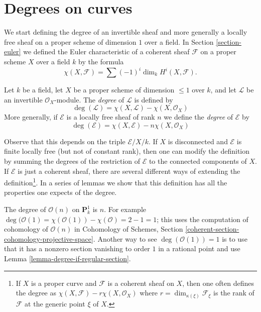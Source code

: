 \section{Degrees on curves}
\label{section-divisors-curves}

\noindent
We start defining the degree of an invertible sheaf and more generally
a locally free sheaf on a proper scheme
of dimension $1$ over a field. In Section \ref{section-euler}
we defined the Euler characteristic
of a coherent sheaf $\mathcal{F}$ on a proper scheme $X$ over a field
$k$ by the formula
$$
\chi(X, \mathcal{F}) = \sum (-1)^i \dim_k H^i(X, \mathcal{F}).
$$

\begin{definition}
\label{definition-degree-invertible-sheaf}
Let $k$ be a field, let $X$ be a proper scheme of dimension $\leq 1$
over $k$, and let $\mathcal{L}$ be an invertible $\mathcal{O}_X$-module.
The {\it degree} of $\mathcal{L}$ is defined by
$$
\deg(\mathcal{L}) = \chi(X, \mathcal{L}) - \chi(X, \mathcal{O}_X)
$$
More generally, if $\mathcal{E}$ is a locally free sheaf of rank $n$
we define the {\it degree} of $\mathcal{E}$ by
$$
\deg(\mathcal{E}) = \chi(X, \mathcal{E}) - n\chi(X, \mathcal{O}_X)
$$
\end{definition}

\noindent
Observe that this depends on the triple $\mathcal{E}/X/k$.
If $X$ is disconnected and $\mathcal{E}$ is finite locally free (but not
of constant rank), then one can modify the definition by summing the degrees
of the restriction of $\mathcal{E}$ to the connected components of $X$.
If $\mathcal{E}$ is just a coherent sheaf, there are several different
ways of extending the definition\footnote{If $X$ is a proper curve
and $\mathcal{F}$ is a coherent sheaf on $X$, then one often defines
the degree as $\chi(X, \mathcal{F}) - r\chi(X, \mathcal{O}_X)$
where $r = \dim_{\kappa(\xi)} \mathcal{F}_\xi$ is the rank of $\mathcal{F}$
at the generic point $\xi$ of $X$.}.
In a series of lemmas we show that this definition has all the properties
one expects of the degree.

\begin{example}
\label{example-degree-P1}
The degree of $\mathcal{O}(n)$ on $\mathbf{P}^1_k$ is $n$. For example
$\deg(\mathcal{O}(1) = \chi(\mathcal{O}(1)) - \chi(\mathcal{O}) = 2 - 1 = 1$;
this uses the computation of cohomology of $\mathcal{O}(n)$ in
Cohomology of Schemes, Section
\ref{coherent-section-cohomology-projective-space}.
Another way to see $\deg(\mathcal{O}(1)) = 1$ is to use that it
has a nonzero section vanishing to order $1$ in a rational point
and use Lemma \ref{lemma-degree-if-regular-section}.
\end{example}


